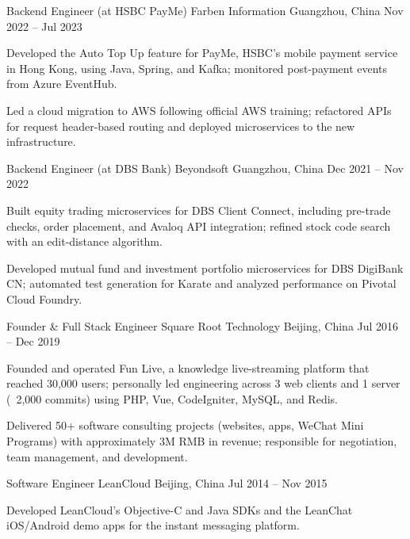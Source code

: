 \begin{cventries}
  \cventry
    {Backend Engineer (at HSBC PayMe)} %
    {Farben Information} %
    {Guangzhou, China} %
    {Nov 2022 -- Jul 2023} %
    {
      \begin{cvitems}
        \item {Developed the Auto Top Up feature for PayMe, HSBC's mobile payment service in Hong Kong, using Java, Spring, and Kafka; monitored post-payment events from Azure EventHub.}
        \item {Led a cloud migration to AWS following official AWS training; refactored APIs for request header-based routing and deployed microservices to the new infrastructure.}
      \end{cvitems}
    }

  \cventry
    {Backend Engineer (at DBS Bank)} %
    {Beyondsoft} %
    {Guangzhou, China} %
    {Dec 2021 -- Nov 2022} %
    {
      \begin{cvitems}
        \item {Built equity trading microservices for DBS Client Connect, including pre-trade checks, order placement, and Avaloq API integration; refined stock code search with an edit-distance algorithm.}
        \item {Developed mutual fund and investment portfolio microservices for DBS DigiBank CN; automated test generation for Karate and analyzed performance on Pivotal Cloud Foundry.}
      \end{cvitems}
    }

  \cventry
    {Founder \& Full Stack Engineer} %
    {Square Root Technology} %
    {Beijing, China} %
    {Jul 2016 -- Dec 2019} %
    {
      \begin{cvitems}
        \item {Founded and operated Fun Live, a knowledge live-streaming platform that reached 30,000 users; personally led engineering across 3 web clients and 1 server (~2,000 commits) using PHP, Vue, CodeIgniter, MySQL, and Redis.}
        \item {Delivered 50+ software consulting projects (websites, apps, WeChat Mini Programs) with approximately 3M RMB in revenue; responsible for negotiation, team management, and development.}
      \end{cvitems}
    }

  \cventry
    {Software Engineer} %
    {LeanCloud} %
    {Beijing, China} %
    {Jul 2014 -- Nov 2015} %
    {
      \begin{cvitems}
        \item {Developed LeanCloud's Objective-C and Java SDKs and the LeanChat iOS/Android demo apps for the instant messaging platform.}
      \end{cvitems}
    }

\end{cventries}
